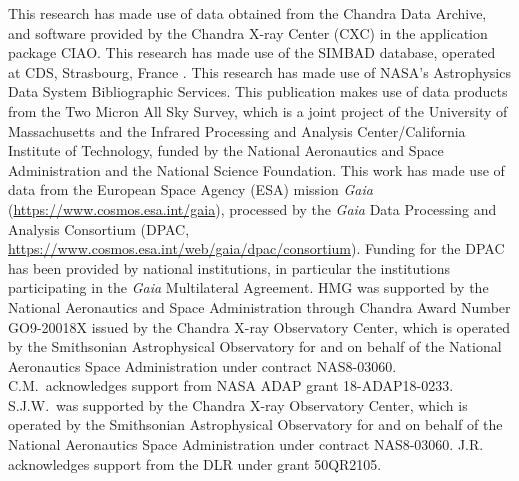 \documentclass[linenumbers]{aastex631}
\begin{document}
\begin{acknowledgements}

This research has made use of data obtained from the Chandra Data Archive, and software provided by the Chandra X-ray Center (CXC) in the application package CIAO.
This research has made use of the SIMBAD database,
operated at CDS, Strasbourg, France \citep{2000A&AS..143....9W}. 
This research has made use of NASA’s Astrophysics Data System Bibliographic Services.
This publication makes use of data products from the Two Micron All Sky Survey, which is a joint project of the University of Massachusetts and the Infrared Processing and Analysis Center/California Institute of Technology, funded by the National Aeronautics and Space Administration and the National Science Foundation.
This work has made use of data from the European Space Agency (ESA) mission
{\it Gaia} (\url{https://www.cosmos.esa.int/gaia}), processed by the {\it Gaia}
Data Processing and Analysis Consortium (DPAC,
\url{https://www.cosmos.esa.int/web/gaia/dpac/consortium}). Funding for the DPAC
has been provided by national institutions, in particular the institutions
participating in the {\it Gaia} Multilateral Agreement.
HMG was supported by the National Aeronautics and Space Administration through Chandra Award Number GO9-20018X issued by the Chandra X-ray Observatory Center, which is operated by the Smithsonian Astrophysical Observatory for and on behalf of the National Aeronautics Space Administration under contract NAS8-03060. C.M.\ acknowledges support from NASA ADAP grant 18-ADAP18-0233. S.J.W.\ was supported by the Chandra X-ray Observatory Center, which is operated by the Smithsonian Astrophysical Observatory for and on behalf of the National Aeronautics Space Administration under contract NAS8-03060. J.R. acknowledges support from the DLR under grant 50QR2105.

\end{acknowledgements}



{}



\end{document}
